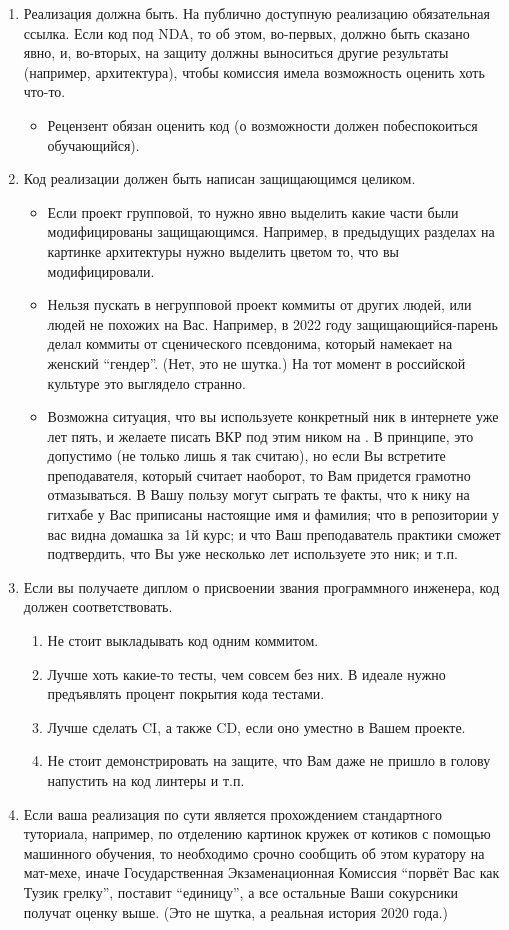 \begin{enumerate}
\item Реализация должна быть. На публично доступную реализацию обязательная ссылка. Если код под \textsc{NDA}, то об этом, во-первых, должно быть сказано явно, и, во-вторых, на защиту должны выно\-ситься другие результаты (например, архитектура), чтобы комис\-сия имела возможность оценить хоть что-то.
\begin{itemize}
\item  Рецензент обязан оценить код (о возможности должен побеспо\-коиться обучающийся).
\end{itemize}
\item Код реализации должен быть написан защищающимся целиком.
\begin{itemize}
\item  Если проект групповой, то нужно явно выделить какие части были модифицированы защищающимся. Например, в преды\-дущих разделах на картинке архитектуры нужно выделить цветом то, что вы модифицировали.
\item Нельзя пускать в негрупповой проект коммиты от других людей, или людей не похожих на Вас. Например, в 2022 году защищающийся-парень делал коммиты от сценического псев\-донима, который намекает на женский ``гендер''. (Нет, это не шутка.) На тот момент в российской культуре это выглядело странно.
\item Возможна ситуация, что вы используете конкретный ник в интернете уже лет пять, и желаете писать ВКР под этим ником на \GitHub{}. В принципе, это допустимо (не только лишь я так считаю), но если Вы встретите преподавателя, который считает наоборот, то Вам придется грамотно отмазы\-ваться. В Вашу пользу могут сыграть те факты, что к нику на гитхабе у Вас приписаны настоящие имя и фамилия; что в репозитории у вас видна домашка за 1й курс; и что Ваш преподаватель практики сможет подтвердить, что Вы уже несколько лет используете это ник; и т.п.
\end{itemize}
\item Если вы получаете диплом о присвоении звания программного инженера, код должен соответствовать.
\begin{enumerate}
\item Не стоит выкладывать код одним коммитом.
\item Лучше хоть какие-то тесты, чем совсем без них. В идеале нужно предъявлять процент покрытия кода тестами.
\item Лучше  сделать \textsc{CI}, а также \textsc{CD}, если оно уместно в Вашем проекте.
\item Не стоит демонстрировать на защите, что Вам даже не пришло в голову напустить на код линтеры и т.п.
\end{enumerate}
\item Если ваша реализация по сути является прохождением стандартного туториала, например, по отделению картинок кружек от котиков с помощью машинного обучения, то необходимо срочно сообщить об этом куратору на мат-мехе, иначе Государственная Экзаменацион\-ная Комиссия ``порвёт Вас как Тузик грелку'', поставит ``единицу'', а все остальные Ваши сокурсники получат оценку выше. (Это не шутка, а реальная история 2020 года.)
\end{enumerate}

